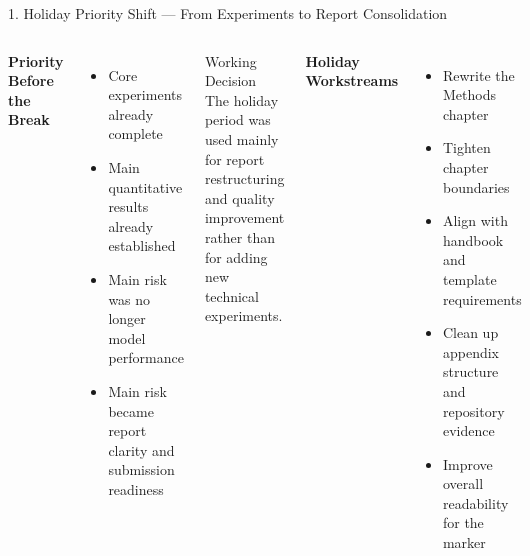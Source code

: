 \documentclass[aspectratio=169, 11pt]{beamer}
\begin{document}
\begin{frame}[shrink=6]{1. Holiday Priority Shift --- From Experiments to Report Consolidation}

    \begin{columns}[T]
        \textbf{Priority Before the Break}
        \begin{itemize}
            \item Core experiments already complete
            \item Main quantitative results already established
            \item Main risk was no longer model performance
            \item Main risk became report clarity and submission readiness
        \end{itemize}

        \vspace{2mm}
        \begin{exampleblock}{Working Decision}
            The holiday period was used mainly for report restructuring and quality improvement rather than for adding new technical experiments.
        \end{exampleblock}

        \textbf{Holiday Workstreams}
        \begin{itemize}
            \item Rewrite the Methods chapter
            \item Tighten chapter boundaries
            \item Align with handbook and template requirements
            \item Clean up appendix structure and repository evidence
            \item Improve overall readability for the marker
        \end{itemize}
    \end{columns}
\end{frame}
\end{document}
